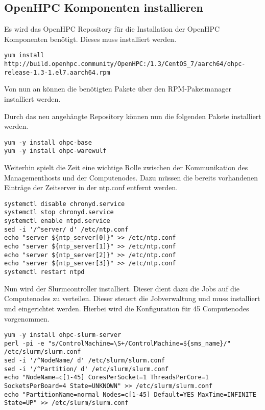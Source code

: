 \subsection{OpenHPC Komponenten installieren}
Es wird das OpenHPC Repository für die Installation der OpenHPC Komponenten benötigt. Dieses muss installiert werden.

\begin{lstlisting}
yum install http://build.openhpc.community/OpenHPC:/1.3/CentOS_7/aarch64/ohpc-release-1.3-1.el7.aarch64.rpm
\end{lstlisting}

Von nun an können die benötigten Pakete über den RPM-Paketmanager installiert werden.

Durch das neu angehängte Repository können nun die folgenden Pakete installiert werden.

\begin{lstlisting}
yum -y install ohpc-base
yum -y install ohpc-warewulf
\end{lstlisting}

Weiterhin spielt die Zeit eine wichtige Rolle zwischen der Kommunikation des Managementhosts und der Computenodes. Dazu müssen die bereits vorhandenen Einträge der Zeitserver in der ntp.conf entfernt werden.


\begin{lstlisting}
systemctl disable chronyd.service
systemctl stop chronyd.service
systemctl enable ntpd.service
sed -i '/^server/ d' /etc/ntp.conf
echo "server ${ntp_server[0]}" >> /etc/ntp.conf
echo "server ${ntp_server[1]}" >> /etc/ntp.conf
echo "server ${ntp_server[2]}" >> /etc/ntp.conf
echo "server ${ntp_server[3]}" >> /etc/ntp.conf
systemctl restart ntpd
\end{lstlisting}

Nun wird der Slurmcontroller installiert. Dieser dient dazu die Jobs auf die Computenodes zu verteilen. Dieser steuert die Jobverwaltung und muss installiert und eingerichtet werden. Hierbei wird die Konfiguration für 45 Computenodes vorgenommen.

\begin{lstlisting}
yum -y install ohpc-slurm-server
perl -pi -e "s/ControlMachine=\S+/ControlMachine=${sms_name}/" /etc/slurm/slurm.conf
sed -i '/^NodeName/ d' /etc/slurm/slurm.conf
sed -i '/^Partition/ d' /etc/slurm/slurm.conf
echo "NodeName=c[1-45] CoresPerSocket=1 ThreadsPerCore=1 SocketsPerBoard=4 State=UNKNOWN" >> /etc/slurm/slurm.conf
echo "PartitionName=normal Nodes=c[1-45] Default=YES MaxTime=INFINITE State=UP" >> /etc/slurm/slurm.conf
\end{lstlisting}

